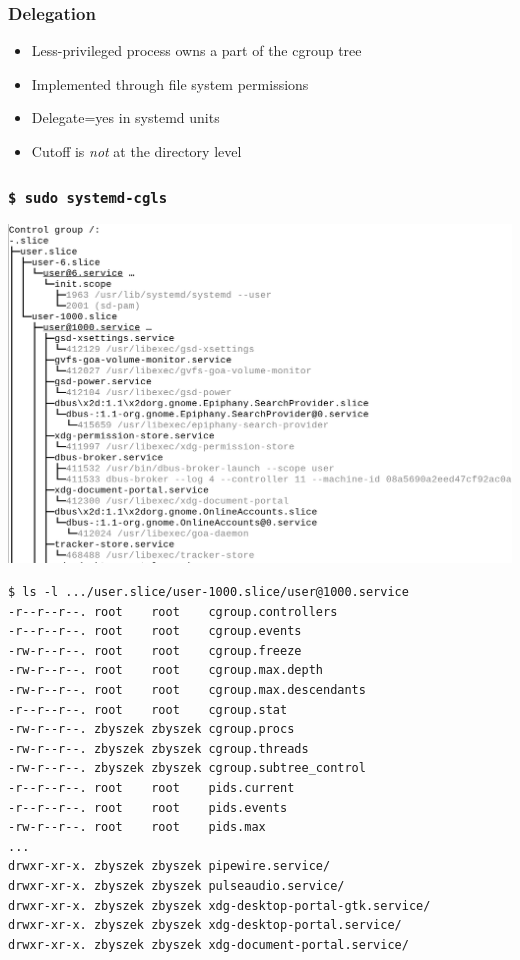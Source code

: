 \documentclass[serif]{beamer}
\begin{document}
\begin{frame}
  \frametitle{Delegation}

  \begin{itemize}
  \item Less-privileged process owns a part of the cgroup tree
  \item Implemented through file system permissions
  \item Delegate=yes in systemd units
  \item Cutoff is \emph{not} at the directory level
  \end{itemize}
\end{frame}

\begin{frame}[fragile]
  \tiny
  \frametitle{\texttt{\$ sudo systemd-cgls}}
  \includegraphics[width=\textwidth]{images/delegation-cgls.png}
\end{frame}

\begin{frame}[fragile]
  \begin{verbatim}
$ ls -l .../user.slice/user-1000.slice/user@1000.service
-r--r--r--. root    root    cgroup.controllers
-r--r--r--. root    root    cgroup.events
-rw-r--r--. root    root    cgroup.freeze
-rw-r--r--. root    root    cgroup.max.depth
-rw-r--r--. root    root    cgroup.max.descendants
-r--r--r--. root    root    cgroup.stat
-rw-r--r--. zbyszek zbyszek cgroup.procs
-rw-r--r--. zbyszek zbyszek cgroup.threads
-rw-r--r--. zbyszek zbyszek cgroup.subtree_control
-r--r--r--. root    root    pids.current
-r--r--r--. root    root    pids.events
-rw-r--r--. root    root    pids.max
...
drwxr-xr-x. zbyszek zbyszek pipewire.service/
drwxr-xr-x. zbyszek zbyszek pulseaudio.service/
drwxr-xr-x. zbyszek zbyszek xdg-desktop-portal-gtk.service/
drwxr-xr-x. zbyszek zbyszek xdg-desktop-portal.service/
drwxr-xr-x. zbyszek zbyszek xdg-document-portal.service/
  \end{verbatim}
\end{frame}
\end{document}
